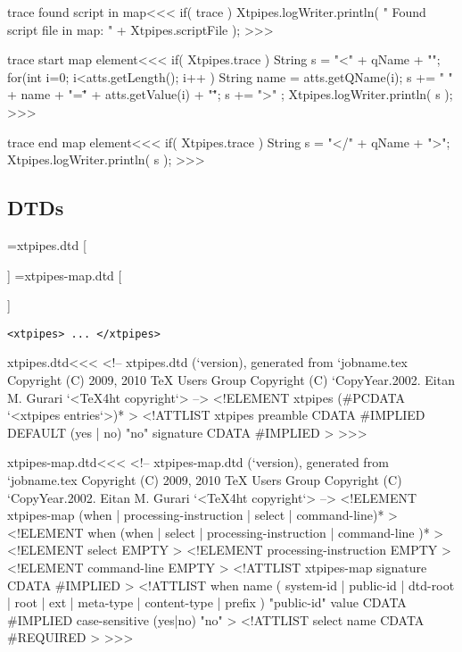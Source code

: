 \documentclass{article}
\begin{document}
{\<trace found script in map\><<<
if( trace ){
   Xtpipes.logWriter.println( " Found script file in map: "
                                + Xtpipes.scriptFile );
}
>>>


\<trace start map element\><<<
if( Xtpipes.trace ){
   String s =  "<" + qName + "\n";
   for(int i=0; i<atts.getLength(); i++ ){
      String name = atts.getQName(i);
      s += " " + name + "=\"" + atts.getValue(i) + "\"";
   }
   s += ">" ;
   Xtpipes.logWriter.println( s );
}
>>>

\<trace end map element\><<<
if( Xtpipes.trace ){
   String s =  "</" + qName + ">";
   Xtpipes.logWriter.println( s );
}
>>>



\subsection{DTDs}



\immediate{}=xtpipes.dtd
 \else
   \immediate{}
   [
     
   \EndHPage{}]
\fi
%
\immediate{}=xtpipes-map.dtd
 \else
   \immediate{}
   [
     
   \EndHPage{}]
\fi

\begin{verbatim}
<xtpipes> ... </xtpipes>
\end{verbatim}

\<xtpipes.dtd\><<<
<!-- xtpipes.dtd (`version), generated from `jobname.tex
     Copyright (C) 2009, 2010 TeX Users Group
     Copyright (C) `CopyYear.2002. Eitan M. Gurari
`<TeX4ht copyright`> -->
<!ELEMENT xtpipes (#PCDATA `<xtpipes entries`>)* >
<!ATTLIST xtpipes
          preamble  CDATA #IMPLIED DEFAULT (yes | no) "no"
          signature CDATA #IMPLIED                         >
>>>


% 

\expandafter\AddFile{}

\<xtpipes-map.dtd\><<<
<!-- xtpipes-map.dtd (`version), generated from `jobname.tex
     Copyright (C) 2009, 2010 TeX Users Group
     Copyright (C) `CopyYear.2002. Eitan M. Gurari
`<TeX4ht copyright`> -->
<!ELEMENT xtpipes-map (when | processing-instruction
                            | select
                            | command-line)*  >
<!ELEMENT when (when | select
                     | processing-instruction
                     | command-line )*  >
<!ELEMENT select EMPTY >
<!ELEMENT processing-instruction EMPTY >
<!ELEMENT command-line EMPTY >
<!ATTLIST xtpipes-map
          signature      CDATA #IMPLIED
>
<!ATTLIST when
          name   (
                    system-id
                  | public-id
                  | dtd-root
                  | root
                  | ext
                  | meta-type
                  | content-type
                  | prefix      )  "public-id"
          value   CDATA #IMPLIED
          case-sensitive (yes|no) "no"
>
<!ATTLIST select
          name      CDATA #REQUIRED
>
>>>


}
\end{document}
